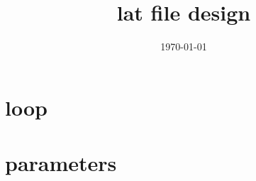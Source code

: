 \documentclass[10pt,CCT]{ctexart}
\begin{document}
\title{lat file design}
 \date{\today}%

\maketitle
\thispagestyle{empty}


 
\section{loop}




\section{parameters}
\end{document}
